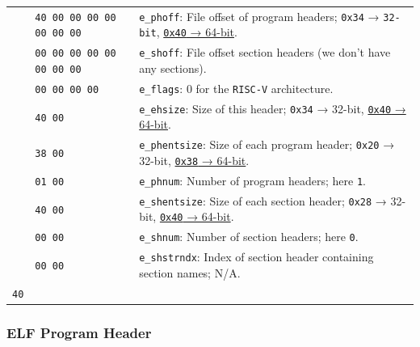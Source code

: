\documentclass[a4paper,12pt,final]{article}
\begin{document}
\begin{table}[!htbp]
\begin{adjustwidth}{-1cm}{-1cm}
\begin{center}
\begin{tabular}{l|l|l}
 & \hspace{0.000000em}​\texttt{40 00 00 00 00 00 00 00} & \texttt{e\_phoff}: File offset of program headers; \texttt{0x34} → \texttt{32-bit}, \uline{\texttt{0x40} → 64-bit}.\\[0pt]
 & \hspace{0.000000em}​\texttt{00 00 00 00 00 00 00 00} & \texttt{e\_shoff}: File offset section headers (we don't have any sections).\\[0pt]
\hline
 & \hspace{0.000000em}​\texttt{00 00 00 00} & \texttt{e\_flags}: 0 for the \texttt{RISC-V} architecture.\\[0pt]
 & \hspace{6.318000em}​\texttt{40 00} & \texttt{e\_ehsize}: Size of this header; \texttt{0x34} → 32-bit, \uline{\texttt{0x40} → 64-bit}.\\[0pt]
 & \hspace{9.477000em}​\texttt{38 00} & \texttt{e\_phentsize}: Size of each program header; \texttt{0x20} → 32-bit, \uline{\texttt{0x38} → 64-bit}.\\[0pt]
 & \hspace{0.000000em}​\texttt{01 00} & \texttt{e\_phnum}: Number of program headers; here \texttt{1}.\\[0pt]
 & \hspace{3.159000em}​\texttt{40 00} & \texttt{e\_shentsize}: Size of each section header; \texttt{0x28} → 32-bit, \uline{\texttt{0x40} → 64-bit}.\\[0pt]
 & \hspace{6.318000em}​\texttt{00 00} & \texttt{e\_shnum}: Number of section headers; here \texttt{0}.\\[0pt]
 & \hspace{9.477000em}​\texttt{00 00} & \texttt{e\_shstrndx}: Index of section header containing section names; N/A.\\[0pt]
\hline
\texttt{40} &  & \\[0pt]
\end{tabular}

\end{center}
\normalsize \end{adjustwidth} \end{table} \vspace{0}

\subsubsection{ELF Program Header}
\label{sec:org7a79576}
\end{document}
